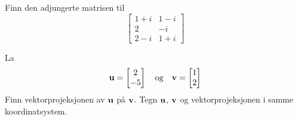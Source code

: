 
\begin{oppgave}
Finn den adjungerte matrisen til
\[
\begin{bmatrix}
 1+i & 1-i\\
 2 & -i\\
 2-i & 1+i
\end{bmatrix}
\]

\end{oppgave}

\begin{oppgave}
La
\[
\mathbf{u}= \begin{bmatrix} 2 \\ -5 \end{bmatrix} \quad \text{og} \quad \mathbf{v}=\begin{bmatrix} 1 \\ 2 \end{bmatrix}
\]
Finn vektorprojeksjonen av $\mathbf{u}$ på $\mathbf{v}$. Tegn $\mathbf{u}$, $\mathbf{v}$ og vektorprojeksjonen i samme koordinatsystem. 
\end{oppgave}

